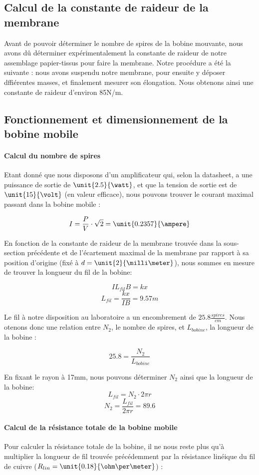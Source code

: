 \subsection{Calcul de la constante de raideur de la membrane}
Avant de pouvoir déterminer le nombre de spires de la bobine mouvante, nous avons dû déterminer
expérimentalement la constante de raideur de notre assemblage papier-tissus pour faire la membrane.
Notre procédure a été la suivante : nous avons suspendu notre membrane, pour ensuite 
y déposer dffiérentes masses, et finalement mesurer son élongation.
Nous obtenons ainsi une constante de raideur d'environ \unit {85}{N/m}.

\subsection{Fonctionnement et dimensionnement de la bobine mobile}

\paragraph{Calcul du nombre de spires}
Etant donné que nous disposons d'un amplificateur qui, selon la datasheet\cite{datasheetampli}, a une puissance de sortie de 
$\unit{2.5}{\watt}$, et que la tension de sortie est de $\unit{15}{\volt}$ (en valeur efficace), nous pouvons trouver le courant
maximal passant dans la bobine mobile :

$$I = \frac{P}{V} \cdot{\sqrt{2}} = \unit{0.2357}{\ampere}$$

En fonction de la constante de raideur de la membrane trouvée dans la sous-section précédente et de l'écartement
maximal de la membrane par rapport à sa position d'origine (fixé à $d = \unit{2}{\milli\meter}$), nous sommes en
mesure de trouver la longueur du fil de la bobine:

$$IL_{fil}B = kx$$
$$L_{fil} = \frac{kx}{IB} = 9.57 m$$

Le fil à notre disposition au laboratoire a un encombrement de $\unit{25.8}{\frac{spires}{cm}}$. Nous otenons 
donc une relation entre $N_2$, le nombre de spires, et $L_{bobine}$, la longueur de la bobine :

$$25.8 = \frac{N_2}{L_{bobine}}$$

En fixant le rayon à \unit{17}{mm}, nous pouvons déterminer $N_2$ ainsi que la longueur de la bobine:
$$L_{fil} = N_2 \cdot 2\pi r$$ 
$$N_2 =  \frac{L_{fil}}{2\pi r} = 89.6$$

\paragraph{Calcul de la résistance totale de la bobine mobile}
Pour calculer la résistance totale de la bobine, il ne nous reste plus qu'à multiplier la longueur de fil trouvée 
précédemment par la résistance linéique du fil de cuivre
($R_{lin} = \unit{0.18}{\ohm\per\meter}$) :

